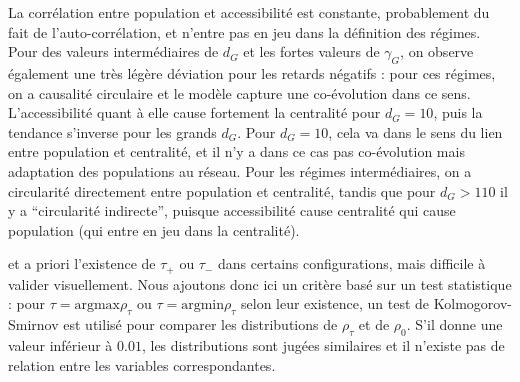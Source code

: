 La corrélation entre population et accessibilité est constante, probablement du fait de l'auto-corrélation, et n'entre pas en jeu dans la définition des régimes. Pour des valeurs intermédiaires de $d_G$ et les fortes valeurs de $\gamma_G$, on observe également une très légère déviation pour les retards négatifs : pour ces régimes, on a causalité circulaire et le modèle capture une co-évolution dans ce sens. L'accessibilité quant à elle cause fortement la centralité pour $d_G = 10$, puis la tendance s'inverse pour les grands $d_G$. Pour $d_G = 10$, cela va dans le sens du lien entre population et centralité, et il n'y a dans ce cas pas co-évolution mais adaptation des populations au réseau. Pour les régimes intermédiaires, on a circularité directement entre population et centralité, tandis que pour $d_G > 110$ il y a ``circularité indirecte'', puisque accessibilité cause centralité qui cause population (qui entre en jeu dans la centralité).


et a priori l'existence de $\tau_+$ ou $\tau_-$ dans certains configurations, mais difficile à valider visuellement. Nous ajoutons donc ici un critère basé sur un test statistique : pour $\tau = \textrm{argmax} \rho_{\tau}$ ou $\tau = \textrm{argmin} \rho_{\tau}$ selon leur existence, un test de Kolmogorov-Smirnov est utilisé pour comparer les distributions de $\rho_{\tau}$ et de $\rho_0$. S'il donne une valeur inférieur à $0.01$, les distributions sont jugées similaires et il n'existe pas de relation entre les variables correspondantes.




